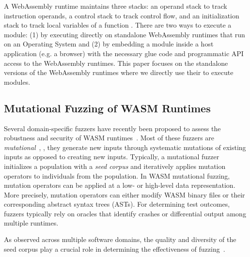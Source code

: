 \documentclass[lettersize,journal]{IEEEtran}
\begin{document}
A WebAssembly runtime maintains three stacks: an operand stack to track instruction operands, a control stack to track control flow, and an initialization stack to track local variables of a function \cite{spec_algo}. There are two ways to execute a \wasm{} module: (1) by executing directly on standalone WebAssembly runtimes that run on an Operating System \cite{zhang2024research} and (2) by embedding a \wasm{} module inside a host application (e.g. a browser) with the necessary glue code and programmatic API access to the WebAssembly runtimes. This paper focuses on the standalone versions of the WebAssembly runtimes where we directly use their  to execute \wasm{} modules.

\subsection{Mutational Fuzzing of WASM Runtimes}
\label{sec:background_fuzzers}

Several domain-specific fuzzers have recently been proposed to assess the robustness and security of WASM runtimes~\cite{wasmsmith, zhou2023wadiff, zhao2024wapplique, cao2024wasmaker, zhou2025lwdiff}. Most of these fuzzers are \emph{mutational}~\cite{zhou2023wadiff, zhao2024wapplique, cao2024wasmaker, zhou2025lwdiff}, \ie{}, they generate new inputs through systematic mutations of existing inputs as opposed to creating new inputs. Typically, a mutational fuzzer initializes a population with a \emph{seed corpus} and iteratively applies mutation operators to individuals from the population. In WASM mutational fuzzing, mutation operators can be applied at a low- or high-level data representation. More precisely, mutation operators can either modify WASM binary files or their corresponding abstract syntax trees (ASTs). For determining test outcomes, fuzzers typically rely on oracles that identify crashes or differential output among multiple runtimes.

As observed across multiple software domains, the quality and diversity of the seed corpus play a crucial role in determining the effectiveness of fuzzing~\cite{miller1990empirical,xu2020krace,lyu2018smartseed,bohme2017markov,manes2019survey}. 





% 
\end{document}
